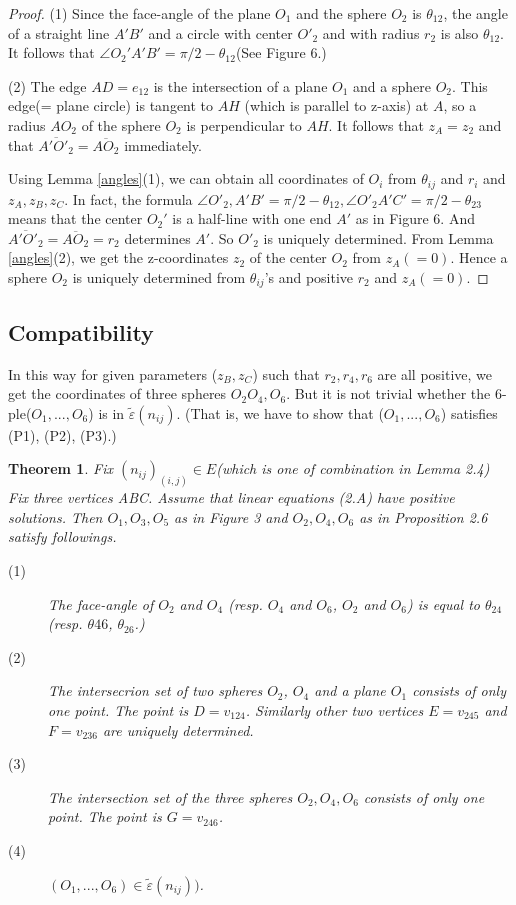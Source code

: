 \documentclass[dvipdfmx]{interact}
\theoremstyle{plain}%
\newtheorem{theorem}{Theorem}[section]
\theoremstyle{definition}
\theoremstyle{remark}
\theoremstyle{problemstyle}
\begin{document}
\begin{proof}
 (1) Since the face-angle of the plane $O_1$ and the sphere $O_2$ is
 $\theta_{12}$, the angle of a straight line $A'B'$ and a circle with
 center $O'_2$ and with radius $r_2$ is also $\theta_{12}$. It follows
 that $\angle O_2'A'B' = \pi/2 - \theta_{12}$(See Figure 6.)
 
 (2) The edge $AD = e_{12}$ is the intersection of a plane $O_1$ and a
 sphere $O_2$. This edge(= plane circle) is tangent to $AH$ (which is
 parallel to z-axis) at $A$, so a radius $AO_2$ of the sphere $O_2$ is
 perpendicular to $AH$. It follows that $z_A=z_2$ and that
 $\overline{A'O'_2} = \overline{AO_2}$ immediately.

 Using Lemma \ref{angles}(1), we can obtain all coordinates of $O_i$ from
 $\theta_{ij}$ and $r_i$ and $z_A, z_B, z_C$. In fact, the formula
 $\angle O'_2, A'B' = \pi/2 - \theta_{12}, \angle O'_{2}A'C' = \pi/2 -
 \theta_{23}$ means that the center $O_2'$ is a half-line with one
 end $A'$ as in Figure 6.
 And $\overline{A'O'_2} = \overline{AO_2} = r_2$ determines $A'$.
 So $O'_2$ is uniquely determined. From Lemma \ref{angles}(2), we get the
 z-coordinates $z_2$ of the center $O_2$ from $z_A(=0)$. Hence a sphere
 $O_2$ is uniquely determined from $\theta_{ij}$'s and positive $r_2$
 and $z_A(= 0)$.
\end{proof}

\subsection{Compatibility}
In this way for given parameters ($z_B, z_C$) such that $r_2, r_4, r_6$
are all positive, we get the coordinates of three spheres 
$O_2 O_4, O_6$. But it is not trivial whether the 6-ple($O_1, ..., O_6$) is
in $\tilde\varepsilon(n_{ij})$. (That is, we have to show that 
($O_1,..., O_6$) satisfies (P1), (P2), (P3).)

\begin{theorem}
 Fix $(n_{ij})_(i, j)\in E$(which is one of combination in Lemma 2.4)
 Fix three vertices ABC. Assume that linear equations (2.A) have
 positive solutions. Then $O_1, O_3, O_5$ as in Figure 3 and $O_2, O_4,
 O_6$ as in Proposition 2.6 satisfy followings.
 \begin{description}
  \item[(1)] The face-angle of $O_2$ and $O_4$ (resp. $O_4$ and $O_6$,
             $O_2$ and $O_6$) is equal to $\theta_{24}$
             (resp. $\theta{46}$, $\theta_{26}$.)
  \item[(2)] The intersecrion set of two spheres $O_2$, $O_4$ and a plane
             $O_1$ consists of only one point. The point is 
             $D = v_{124}$. Similarly other two vertices $E = v_{245}$
             and $F = v_{236}$ are uniquely determined.
  \item[(3)] The intersection set of the three spheres $O_2, O_4, O_6$
             consists of only one point. The point is $G = v_{246}$.
             
  \item[(4)] $(O_1, ..., O_6) \in \tilde\varepsilon(n_{ij}))$.
\end{description}
\end{theorem}
\end{document}

